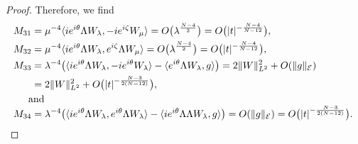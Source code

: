 \documentclass[a4paper,two-side,10pt]{amsart}
\numberwithin{equation}{section}
\begin{document}
\begin{proof}
Therefore, we find
\begin{align*}
M_{31} &= \mu^{-4}\langle i e^{i\theta}  \Lambda W_\lambda , - i e^{i\zeta} W_\mu \rangle  = O\big(\lambda^{\frac{N-4}{2}}\big)
=O\big(|t|^{-\frac{N-4}{N-12}}\big),\\
M_{32}&= \mu^{-4}  \langle  i e^{i\theta} \Lambda W_\lambda , e^{i\zeta} \Lambda W_\mu\rangle  = O\big(\lambda^{\frac{N-4}{2}}\big)
=O\big(|t|^{-\frac{N-4}{N-12}}\big),\\
M_{33}&= \lambda^{-4}  \big(\langle ie^{i\theta}\Lambda  W_\lambda ,-i e^{i\theta} W_\lambda \rangle - \langle e^{i\theta} \Lambda W_\lambda ,g\rangle\big)  =2\|W\|_{L^2}^2 +O(\|g\|_{\mathcal{E}})\\
&= 2 \|W\|_{L^2}^2 +O\big(|t|^{-\frac{N-3}{2(N-12)}}\big),\\
\noalign{and}
M_{34}&= \lambda^{-4} \big( \langle ie^{i\theta} \Lambda  W_\lambda , e^{i\theta} \Lambda W_\lambda \rangle -\langle ie^{i\theta} \Lambda \Lambda W_\lambda ,g \rangle \big)= O(\|g\|_{\mathcal{E}}) =
O\big(|t|^{-\frac{N-3}{2(N-12)}}\big).
\end{align*}


\end{proof}
\end{document}
